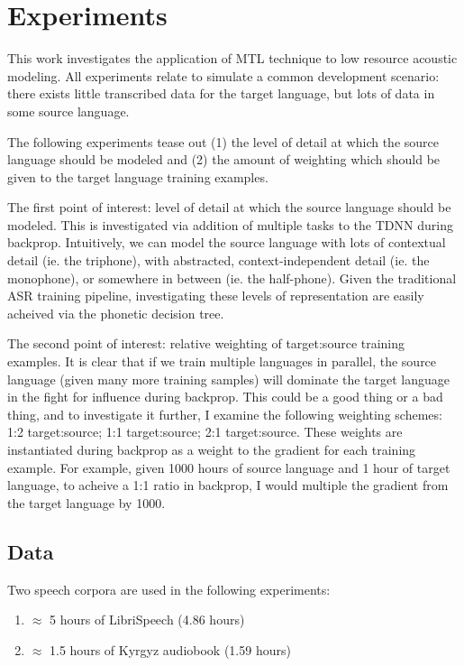 \documentclass[a4paper]{article}
\begin{document}
\section{Experiments}

This work investigates the application of MTL technique to low resource acoustic modeling. All experiments relate to simulate a common development scenario: there exists little transcribed data for the target language, but lots of data in some source language.

The following experiments tease out (1) the level of detail at which the source language should be modeled and (2) the amount of weighting which should be given to the target language training examples.

The first point of interest: level of detail at which the source language should be modeled. This is investigated via addition of multiple tasks to the TDNN during backprop. Intuitively, we can model the source language with lots of contextual detail (ie. the triphone), with abstracted, context-independent detail (ie. the monophone), or somewhere in between (ie. the half-phone). Given the traditional ASR training pipeline, investigating these levels of representation are easily acheived via the phonetic decision tree.

The second point of interest: relative weighting of target:source training examples. It is clear that if we train multiple languages in parallel, the source language (given many more training samples) will dominate the target language in the fight for influence during backprop. This could be a good thing or a bad thing, and to investigate it further, I examine the following weighting schemes: 1:2 target:source; 1:1 target:source; 2:1 target:source. These weights are instantiated during backprop as a weight to the gradient for each training example. For example, given 1000 hours of source language and 1 hour of target language, to acheive a 1:1 ratio in backprop, I would multiple the gradient from the target language by 1000. 



\subsection{Data}

Two speech corpora are used in the following experiments:

\begin{enumerate}
\item $\approx$ 5 hours of LibriSpeech (4.86 hours)
\item $\approx$ 1.5 hours of Kyrgyz audiobook (1.59 hours)
\end{enumerate}
\end{document}
